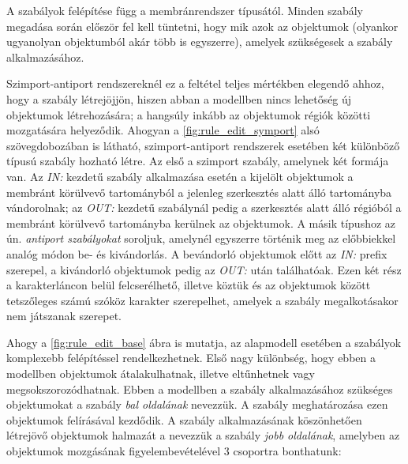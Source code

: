  A szabályok felépítése függ a membránrendszer típusától. Minden szabály megadása során először fel kell tüntetni, hogy mik azok az objektumok (olyankor ugyanolyan objektumból akár több is egyszerre), amelyek szükségesek a szabály alkalmazásához. 

Szimport-antiport rendszereknél ez a feltétel teljes mértékben elegendő ahhoz, hogy a szabály létrejöjjön, hiszen abban a modellben nincs lehetőség új objektumok létrehozására; a hangsúly inkább az objektumok régiók közötti mozgatására helyeződik. Ahogyan a \ref{fig:rule_edit_symport} alsó szövegdobozában is látható, szimport-antiport rendszerek esetében két különböző típusú szabály hozható létre. Az első a szimport szabály, amelynek két formája van. Az \textit{IN:} kezdetű szabály alkalmazása esetén a kijelölt objektumok a membránt körülvevő tartományból a jelenleg szerkesztés alatt álló tartományba vándorolnak; az \textit{OUT:} kezdetű szabálynál pedig a szerkesztés alatt álló régióból a membránt körülvevő tartományba kerülnek az objektumok. A másik típushoz az ún. \textit{antiport szabályokat}  soroljuk, amelynél egyszerre történik meg az előbbiekkel analóg módon be- és kivándorlás. A bevándorló objektumok előtt az \textit{IN:} prefix szerepel, a kivándorló objektumok pedig az \textit{OUT:} után találhatóak. Ezen két rész a karakterláncon belül felcserélhető, illetve köztük és az objektumok között tetszőleges számú szóköz karakter szerepelhet, amelyek a szabály megalkotásakor nem játszanak szerepet.

Ahogy a \ref{fig:rule_edit_base} ábra is mutatja, az alapmodell esetében a szabályok komplexebb felépítéssel rendelkezhetnek. Első nagy különbség, hogy ebben a modellben objektumok átalakulhatnak, illetve eltűnhetnek vagy megsokszorozódhatnak. Ebben a modellben a szabály alkalmazásához szükséges objektumokat a szabály \textit{bal oldalának} nevezzük. A szabály meghatározása ezen objektumok felírásával kezdődik. A szabály alkalmazásának köszönhetően létrejövő objektumok halmazát a nevezzük a szabály \textit{jobb oldalának}, amelyben az objektumok mozgásának figyelembevételével 3 csoportra bonthatunk:

